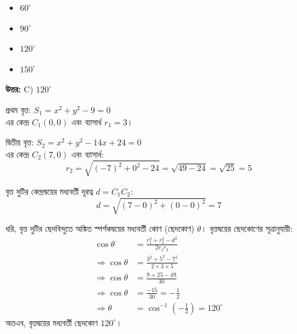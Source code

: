 \documentclass[12pt, a4paper]{article}
\begin{document}
\vspace{1em}
\begin{itemize}[label={}, leftmargin=1cm, itemsep=0.5em]
    \item[\textbf{A)}] $60^{\circ}$
    \item[\textbf{B)}] $90^{\circ}$
    \item[\textbf{C)}] $120^{\circ}$
    \item[\textbf{D)}] $150^{\circ}$
\end{itemize}

\vspace{0.5em}
\begin{tcolorbox}[answerbox]
    \textbf{\color{success} উত্তর:} C) $120^{\circ}$
\end{tcolorbox}
\vspace{1em}

\begin{tcolorbox}[solutionbox={সমাধান (Solution)}]
    \noindent
    প্রথম বৃত্ত: $S_1 = x^2 + y^2 - 9 = 0$ \\
    এর কেন্দ্র $C_1(0, 0)$ এবং ব্যাসার্ধ $r_1 = 3$।
    
    দ্বিতীয় বৃত্ত: $S_2 = x^2 + y^2 - 14x + 24 = 0$ \\
    এর কেন্দ্র $C_2(7, 0)$ এবং ব্যাসার্ধ:
    \[ r_2 = \sqrt{(-7)^2 + 0^2 - 24} = \sqrt{49 - 24} = \sqrt{25} = 5 \]
    
    বৃত্ত দুটির কেন্দ্রদ্বয়ের মধ্যবর্তী দূরত্ব $d = C_1C_2$:
    \[ d = \sqrt{(7 - 0)^2 + (0 - 0)^2} = 7 \]
    
    ধরি, বৃত্ত দুটির ছেদবিন্দুতে অঙ্কিত স্পর্শকদ্বয়ের মধ্যবর্তী কোণ (ছেদকোণ) $\theta$। বৃত্তদ্বয়ের ছেদকোণের সূত্রানুযায়ী:
    \begin{align*}
        \cos\theta &= \frac{r_1^2 + r_2^2 - d^2}{2r_1r_2} \\
        \Rightarrow \cos\theta &= \frac{3^2 + 5^2 - 7^2}{2 \times 3 \times 5} \\
        \Rightarrow \cos\theta &= \frac{9 + 25 - 49}{30} \\
        \Rightarrow \cos\theta &= \frac{-15}{30} = -\frac{1}{2} \\
        \Rightarrow \theta &= \cos^{-1}\left(-\frac{1}{2}\right) = 120^{\circ}
    \end{align*}
    অতএব, বৃত্তদ্বয়ের মধ্যবর্তী ছেদকোণ \textbf{$120^{\circ}$}।
\end{tcolorbox}

\vspace{2em}
\end{document}
